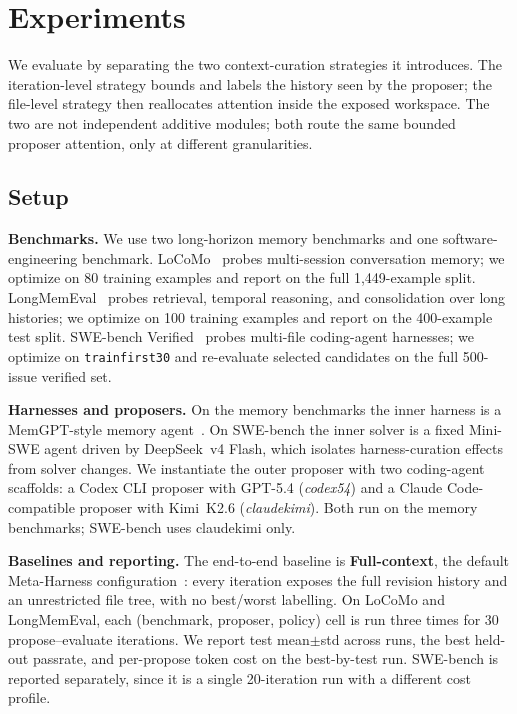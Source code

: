 \section{Experiments}
\label{sec:experiments}

We evaluate \name by separating the two context-curation strategies it
introduces. The iteration-level strategy bounds and labels the history seen
by the proposer; the file-level strategy then reallocates attention inside
the exposed workspace. The two are not independent additive modules; both
route the same bounded proposer attention, only at different granularities.

\subsection{Setup}
\label{sec:setup}
\textbf{Benchmarks.}
We use two long-horizon memory benchmarks and one software-engineering
benchmark. LoCoMo~\cite{maharana2024locomo} probes multi-session conversation
memory; we optimize on 80 training examples and report on the full
1,449-example split. LongMemEval~\cite{wu2024longmemeval} probes retrieval,
temporal reasoning, and consolidation over long histories; we optimize on
100 training examples and report on the 400-example test split. SWE-bench
Verified~\cite{openai2024swebenchverified} probes multi-file coding-agent
harnesses; we optimize on \texttt{trainfirst30} and re-evaluate selected
candidates on the full 500-issue verified set.

\textbf{Harnesses and proposers.}
On the memory benchmarks the inner harness is a MemGPT-style memory
agent~\cite{packer2023memgpt}. On SWE-bench the inner solver is a fixed
Mini-SWE agent driven by DeepSeek~v4 Flash, which isolates harness-curation
effects from solver changes. We instantiate the outer proposer with two
coding-agent scaffolds: a Codex CLI proposer with GPT-5.4 (\emph{codex54})
and a Claude Code-compatible proposer with Kimi~K2.6 (\emph{claudekimi}).
Both run on the memory benchmarks; SWE-bench uses claudekimi only.

\textbf{Baselines and reporting.}
The end-to-end baseline is \textbf{Full-context}, the default Meta-Harness
configuration~\cite{lee2026metaharness}: every iteration exposes the full
revision history and an unrestricted file tree, with no best/worst labelling.
On LoCoMo and LongMemEval, each (benchmark, proposer, policy) cell is run
three times for 30 propose--evaluate iterations. We report test mean$\pm$std
across runs, the best held-out passrate, and per-propose token cost on the
best-by-test run. SWE-bench is reported separately, since it is a single
20-iteration run with a different cost profile.

